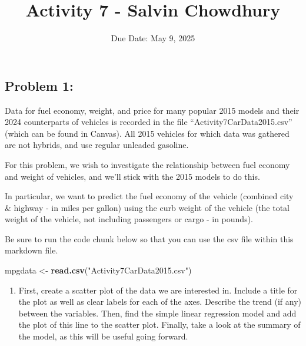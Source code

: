 \documentclass[
]{article}
\title{Activity 7 - Salvin Chowdhury}
\author{}
\date{\vspace{-2.5em}Due Date: May 9, 2025}
\newenvironment{Shaded}{\begin{snugshade}}{\end{snugshade}}
\newcommand{\AttributeTok}[1]{\textcolor[rgb]{0.13,0.29,0.53}{#1}}
\newcommand{\CommentTok}[1]{\textcolor[rgb]{0.56,0.35,0.01}{\textit{#1}}}
\newcommand{\DecValTok}[1]{\textcolor[rgb]{0.00,0.00,0.81}{#1}}
\newcommand{\FloatTok}[1]{\textcolor[rgb]{0.00,0.00,0.81}{#1}}
\newcommand{\FunctionTok}[1]{\textcolor[rgb]{0.13,0.29,0.53}{\textbf{#1}}}
\newcommand{\NormalTok}[1]{#1}
\newcommand{\OtherTok}[1]{\textcolor[rgb]{0.56,0.35,0.01}{#1}}
\newcommand{\SpecialCharTok}[1]{\textcolor[rgb]{0.81,0.36,0.00}{\textbf{#1}}}
\newcommand{\StringTok}[1]{\textcolor[rgb]{0.31,0.60,0.02}{#1}}
\providecommand{\tightlist}{%
  \setlength{\itemsep}{0pt}\setlength{\parskip}{0pt}}
\begin{document}
\maketitle

\subsection{Problem 1:}\label{problem-1}

Data for fuel economy, weight, and price for many popular 2015 models
and their 2024 counterparts of vehicles is recorded in the file
``Activity7CarData2015.csv'' (which can be found in Canvas). All 2015
vehicles for which data was gathered are not hybrids, and use regular
unleaded gasoline.

For this problem, we wish to investigate the relationship between fuel
economy and weight of vehicles, and we'll stick with the 2015 models to
do this.

In particular, we want to predict the fuel economy of the vehicle
(combined city \& highway - in miles per gallon) using the curb weight
of the vehicle (the total weight of the vehicle, not including
passengers or cargo - in pounds).

Be sure to run the code chunk below so that you can use the csv file
within this markdown file.

\begin{Shaded}
\begin{Highlighting}[]
\NormalTok{mpgdata }\OtherTok{\textless{}{-}} \FunctionTok{read.csv}\NormalTok{(}\StringTok{"Activity7CarData2015.csv"}\NormalTok{)}
\end{Highlighting}
\end{Shaded}

\begin{enumerate}
\def\labelenumi{(\alph{enumi})}
\tightlist
\item
  First, create a scatter plot of the data we are interested in. Include
  a title for the plot as well as clear labels for each of the axes.
  Describe the trend (if any) between the variables. Then, find the
  simple linear regression model and add the plot of this line to the
  scatter plot. Finally, take a look at the summary of the model, as
  this will be useful going forward.
\end{enumerate}

\begin{Shaded}
\end{Shaded}
\end{document}
